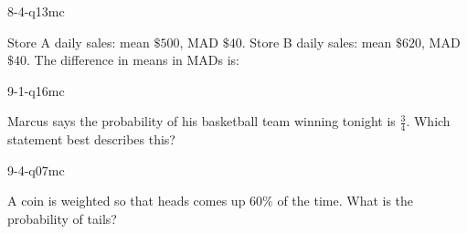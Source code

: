 \begin{practiceQuestion}{8-4-q13}{mc}
\begin{questionText}
Store A daily sales: mean $\$500$, MAD $\$40$. Store B daily sales: mean $\$620$, MAD $\$40$. The difference in means in MADs is:
\end{questionText}
\end{practiceQuestion}

\begin{practiceQuestion}{9-1-q16}{mc}
\begin{questionText}
Marcus says the probability of his basketball team winning tonight is $\frac{3}{4}$. Which statement best describes this?
\end{questionText}
\end{practiceQuestion}

\begin{practiceQuestion}{9-4-q07}{mc}
\begin{questionText}
A coin is weighted so that heads comes up $60\%$ of the time. What is the probability of tails?
\end{questionText}
\end{practiceQuestion}

